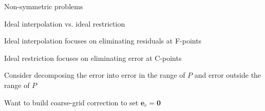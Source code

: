 \documentclass[18pt,xcolor=table]{beamer}
\begin{document}
\begin{frame}{Non-symmetric problems}
\begin{block}{Ideal interpolation vs. ideal restriction}
\bit
\item Ideal interpolation focuses on eliminating residuals at F-points
\item Ideal restriction focuses on eliminating error at C-points
\item Consider decomposing the error into error in the range of $P$ and error outside the range of $P$
\item Want to build coarse-grid correction to set $\mathbf{e}_c = \mathbf{0}$
\eit
\end{block}
\end{frame}
\end{document}
